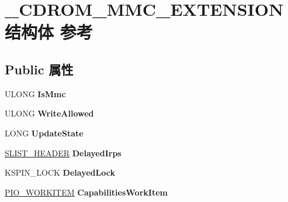 \hypertarget{struct___c_d_r_o_m___m_m_c___e_x_t_e_n_s_i_o_n}{}\section{\+\_\+\+C\+D\+R\+O\+M\+\_\+\+M\+M\+C\+\_\+\+E\+X\+T\+E\+N\+S\+I\+O\+N结构体 参考}
\label{struct___c_d_r_o_m___m_m_c___e_x_t_e_n_s_i_o_n}
\subsection*{Public 属性}
\begin{DoxyCompactItemize}
\item 
\mbox{\label{struct___c_d_r_o_m___m_m_c___e_x_t_e_n_s_i_o_n_a3805105ca698c5d24e543790ad203368}} 
U\+L\+O\+NG {\bfseries Is\+Mmc}
\item 
\mbox{\label{struct___c_d_r_o_m___m_m_c___e_x_t_e_n_s_i_o_n_a26d94a6ad98e664ff88baddb57888c55}} 
U\+L\+O\+NG {\bfseries Write\+Allowed}
\item 
\mbox{\label{struct___c_d_r_o_m___m_m_c___e_x_t_e_n_s_i_o_n_aea893fadf8065c7cb360d39ef55589da}} 
L\+O\+NG {\bfseries Update\+State}
\item 
\mbox{\label{struct___c_d_r_o_m___m_m_c___e_x_t_e_n_s_i_o_n_ab8163e3c87cec12dbce232c1a1920f21}} 
\hyperlink{union___s_l_i_s_t___h_e_a_d_e_r}{S\+L\+I\+S\+T\+\_\+\+H\+E\+A\+D\+ER} {\bfseries Delayed\+Irps}
\item 
\mbox{\label{struct___c_d_r_o_m___m_m_c___e_x_t_e_n_s_i_o_n_a1b7a9ff1b2b5470015109204d56875d0}} 
K\+S\+P\+I\+N\+\_\+\+L\+O\+CK {\bfseries Delayed\+Lock}
\item 
\mbox{\label{struct___c_d_r_o_m___m_m_c___e_x_t_e_n_s_i_o_n_a15c4065013aeea44d68439da65b8758e}} 
\hyperlink{struct___i_o___w_o_r_k_i_t_e_m}{P\+I\+O\+\_\+\+W\+O\+R\+K\+I\+T\+EM} {\bfseries Capabilities\+Work\+Item}
\item 

\end{DoxyCompactItemize}
